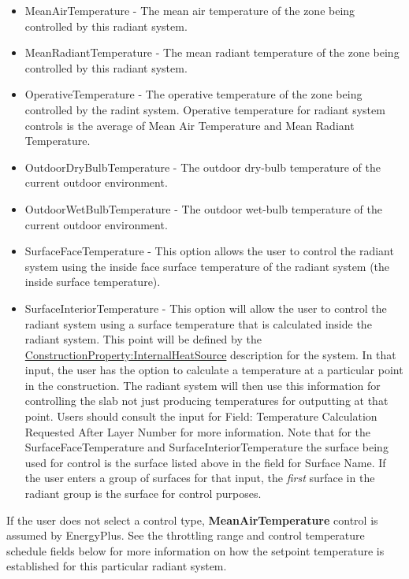 \begin{itemize}
\item
  MeanAirTemperature - The mean air temperature of the zone being controlled by this radiant system.
\item
  MeanRadiantTemperature - The mean radiant temperature of the zone being controlled by this radiant system.
\item
  OperativeTemperature - The operative temperature of the zone being controlled by the radint system. Operative temperature for radiant system controls is the average of Mean Air Temperature and Mean Radiant Temperature.
\item
  OutdoorDryBulbTemperature - The outdoor dry-bulb temperature of the current outdoor environment.
\item
  OutdoorWetBulbTemperature - The outdoor wet-bulb temperature of the current outdoor environment.
\item
  SurfaceFaceTemperature - This option allows the user to control the radiant system using the inside face surface temperature of the radiant system (the inside surface temperature).
\item SurfaceInteriorTemperature - This option will allow the user to control
      the radiant system using a surface temperature that is calculated inside
      the radiant system.  This point will be defined by the
      \hyperref[constructioninternalsource]{ConstructionProperty:InternalHeatSource}
      description for the system.  In that input, the user has the option to
      calculate a temperature at a particular point in the construction.  The
      radiant system will then use this information for controlling the slab
      not just producing temperatures for outputting at that point.  Users
      should consult the input for Field: Temperature Calculation Requested
      After Layer Number for more information.  Note that for the
      SurfaceFaceTemperature and SurfaceInteriorTemperature the surface being
      used for control is the surface listed above in the field for Surface
      Name.  If the user enters a group of surfaces for that input, the
      \emph{first} surface in the radiant group is the surface for control
      purposes.
\end{itemize}

If the user does not select a control type, \textbf{MeanAirTemperature} control is assumed by EnergyPlus. See the throttling range and control temperature schedule fields below for more information on how the setpoint temperature is established for this particular radiant system.

